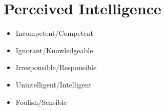 \section{Perceived Intelligence}
\begin{itemize}
\item Incompetent/Competent 
\item Ignorant/Knowledgeable
\item Irresponsible/Responsible
\item Unintelligent/Intelligent 
\item Foolish/Sensible
\end{itemize}

